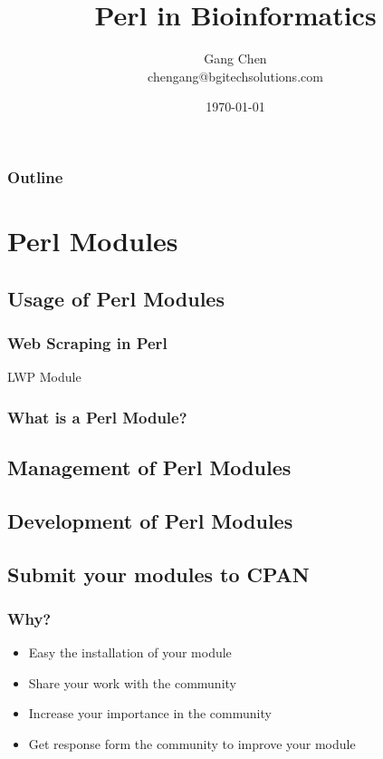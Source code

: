 \documentclass[UTF8]{beamer}
\title{Perl in Bioinformatics}
\author{Gang Chen\\ chengang@bgitechsolutions.com}
\date{\today}
\begin{document}
\begin{frame}
\titlepage
\end{frame}
\begin{frame}[t]\frametitle{Outline}
\tableofcontents[hideallsubsections]
\end{frame}

\section{Perl Modules}

\subsection{Usage of Perl Modules}
\begin{frame}
  \frametitle{Web Scraping in Perl}
  \begin{block}{LWP Module}
  \end{block}
\end{frame}


\begin{frame}
  \frametitle{What is a Perl Module?}
\end{frame}

\subsection{Management of Perl Modules}

\subsection{Development of Perl Modules}

\subsection{Submit your modules to CPAN}

\begin{frame}
  \frametitle{Why?}
  \begin{itemize}
    \item Easy the installation of your module
    \item Share your work with the community
    \item Increase your importance in the community
    \item Get response form the community to improve your module
  \end{itemize}
\end{frame}
\end{document}
